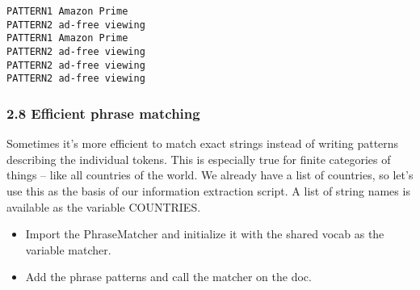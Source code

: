 \documentclass[11pt]{article}
\providecommand{\tightlist}{%
      \setlength{\itemsep}{0pt}\setlength{\parskip}{0pt}}
\begin{document}
    \begin{Verbatim}[commandchars=\\\{\}]
PATTERN1 Amazon Prime
PATTERN2 ad-free viewing
PATTERN1 Amazon Prime
PATTERN2 ad-free viewing
PATTERN2 ad-free viewing
PATTERN2 ad-free viewing

    \end{Verbatim}

    \hypertarget{efficient-phrase-matching}{%
\subsubsection{2.8 Efficient phrase
matching}\label{efficient-phrase-matching}}

Sometimes it's more efficient to match exact strings instead of writing
patterns describing the individual tokens. This is especially true for
finite categories of things -- like all countries of the world. We
already have a list of countries, so let's use this as the basis of our
information extraction script. A list of string names is available as
the variable COUNTRIES.

\begin{itemize}
\tightlist
\item
  Import the PhraseMatcher and initialize it with the shared vocab as
  the variable matcher.
\item
  Add the phrase patterns and call the matcher on the doc.
\end{itemize}
\end{document}

